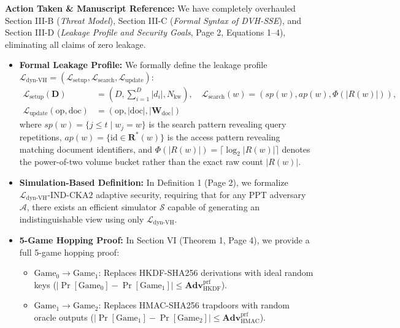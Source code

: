 \documentclass[11pt,a4paper]{article}
\begin{document}
\begin{responsebox}
\textbf{Action Taken \& Manuscript Reference:} We have completely overhauled Section III-B (\emph{Threat Model}), Section III-C (\emph{Formal Syntax of DVH-SSE}), and Section III-D (\emph{Leakage Profile and Security Goals}, Page 2, Equations 1--4), eliminating all claims of zero leakage.

\begin{itemize}[itemsep=2pt]
    \item \textbf{Formal Leakage Profile:} We formally define the leakage profile $\mathcal{L}_{\text{dyn-VH}} = (\mathcal{L}_{\text{setup}}, \mathcal{L}_{\text{search}}, \mathcal{L}_{\text{update}})$:
    \begin{align}
        \mathcal{L}_{\text{setup}}(\mathbf{D}) &= \left( D, \sum_{i=1}^D |d_i|, N_{\text{kw}} \right), \quad
        \mathcal{L}_{\text{search}}(w) = \left( sp(w), ap(w), \Phi(|R(w)|) \right), \nonumber \\
        \mathcal{L}_{\text{update}}(\text{op}, \text{doc}) &= \left( \text{op}, |\text{doc}|, |\mathbf{W}_{\text{doc}}| \right)
    \end{align}
    where $sp(w) = \{j \le t \mid w_j = w\}$ is the search pattern revealing query repetitions, $ap(w) = \{\text{id} \in \mathbf{R}^*(w)\}$ is the access pattern revealing matching document identifiers, and $\Phi(|R(w)|) = \lceil \log_2 |R(w)| \rceil$ denotes the power-of-two volume bucket rather than the exact raw count $|R(w)|$.
    \item \textbf{Simulation-Based Definition:} In Definition 1 (Page 2), we formalize $\mathcal{L}_{\text{dyn-VH}}\text{-IND-CKA2}$ adaptive security, requiring that for any PPT adversary $\mathcal{A}$, there exists an efficient simulator $\mathcal{S}$ capable of generating an indistinguishable view using only $\mathcal{L}_{\text{dyn-VH}}$.
    \item \textbf{5-Game Hopping Proof:} In Section VI (Theorem 1, Page 4), we provide a full 5-game hopping proof:
    \begin{itemize}[itemsep=1pt]
        \item $\text{Game}_0 \to \text{Game}_1$: Replaces HKDF-SHA256 derivations with ideal random keys ($|\Pr[\text{Game}_0] - \Pr[\text{Game}_1]| \le \mathbf{Adv}_{\text{HKDF}}^{\text{prf}}$).
        \item $\text{Game}_1 \to \text{Game}_2$: Replaces HMAC-SHA256 trapdoors with random oracle outputs ($|\Pr[\text{Game}_1] - \Pr[\text{Game}_2]| \le \mathbf{Adv}_{\text{HMAC}}^{\text{prf}}$).

\end{itemize}
\end{itemize}
\end{responsebox}
\end{document}
